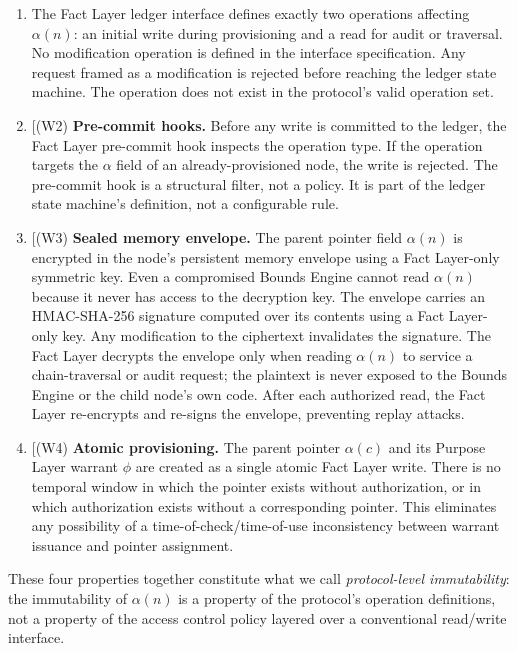 \begin{enumerate}
\item[(W1) \textbf{No modification operation defined.}] The Fact Layer ledger interface defines exactly two operations affecting $\alpha(n)$: an initial write during provisioning and a read for audit or traversal. No modification operation is defined in the interface specification. Any request framed as a modification is rejected before reaching the ledger state machine. The operation does not exist in the protocol's valid operation set.

\item[(W2) \textbf{Pre-commit hooks.} Before any write is committed to the ledger, the Fact Layer pre-commit hook inspects the operation type. If the operation targets the $\alpha$ field of an already-provisioned node, the write is rejected. The pre-commit hook is a structural filter, not a policy. It is part of the ledger state machine's definition, not a configurable rule.

\item[(W3) \textbf{Sealed memory envelope.} The parent pointer field $\alpha(n)$ is encrypted in the node's persistent memory envelope using a Fact Layer-only symmetric key. Even a compromised Bounds Engine cannot read $\alpha(n)$ because it never has access to the decryption key. The envelope carries an HMAC-SHA-256 signature computed over its contents using a Fact Layer-only key. Any modification to the ciphertext invalidates the signature. The Fact Layer decrypts the envelope only when reading $\alpha(n)$ to service a chain-traversal or audit request; the plaintext is never exposed to the Bounds Engine or the child node's own code. After each authorized read, the Fact Layer re-encrypts and re-signs the envelope, preventing replay attacks.

\item[(W4) \textbf{Atomic provisioning.} The parent pointer $\alpha(c)$ and its Purpose Layer warrant $\phi$ are created as a single atomic Fact Layer write. There is no temporal window in which the pointer exists without authorization, or in which authorization exists without a corresponding pointer. This eliminates any possibility of a time-of-check/time-of-use inconsistency between warrant issuance and pointer assignment.
\end{enumerate}

These four properties together constitute what we call \emph{protocol-level immutability}: the immutability of $\alpha(n)$ is a property of the protocol's operation definitions, not a property of the access control policy layered over a conventional read/write interface.

